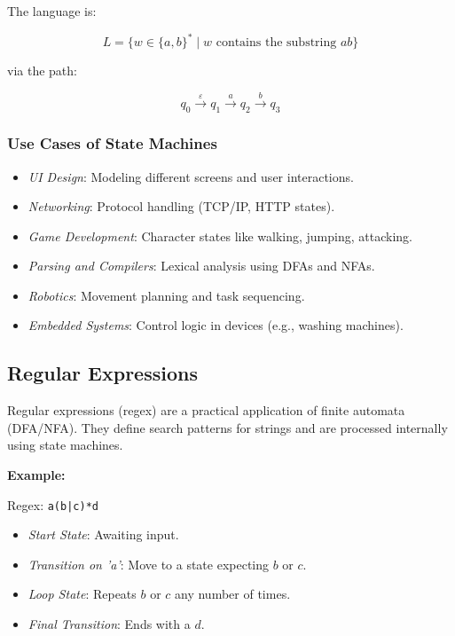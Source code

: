 The language is:

\[
    L = \{ w \in \{a,b\}^* \mid w \text{ contains the substring } ab \}
\]

via the path:

\[
    q_0 \xrightarrow{\varepsilon} q_1 \xrightarrow{a} q_2 \xrightarrow{b} q_3
\]

\subsubsection{Use Cases of State Machines}

\begin{itemize}

    \item \emph{UI Design}: Modeling different screens and user interactions.
    
    \item \emph{Networking}: Protocol handling (TCP/IP, HTTP states).
    
    \item \emph{Game Development}: Character states like walking, jumping, attacking.
    
    \item \emph{Parsing and Compilers}: Lexical analysis using DFAs and NFAs.
    
    \item \emph{Robotics}: Movement planning and task sequencing.
    
    \item \emph{Embedded Systems}: Control logic in devices (e.g., washing machines).

\end{itemize}

\subsection{Regular Expressions}

Regular expressions (regex) are a practical application of finite automata (DFA/NFA). They define 
search patterns for strings and are processed internally using state machines.

\textbf{Example:}

Regex: \texttt{a(b|c)*d}

\begin{itemize}
    
    \item \emph{Start State}: Awaiting input.
    
    \item \emph{Transition on 'a'}: Move to a state expecting \( b \) or \( c \).
    
    \item \emph{Loop State}: Repeats \( b \) or \( c \) any number of times.
    
    \item \emph{Final Transition}: Ends with a \( d \).

\end{itemize}

